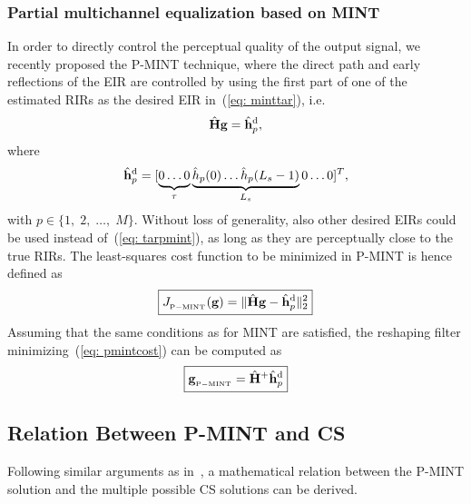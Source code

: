 \documentclass[10pt]{IEEEtran}
\begin{document}
\subsubsection*{Partial multichannel equalization based on MINT~\cite{Kodrasi_ICASSP_2012}}
In order to directly control the perceptual quality of the output signal, we recently proposed the P-MINT technique, where the direct path and early reflections of the EIR are controlled by using the first part of one of the estimated RIRs as the desired EIR in~(\ref{eq: minttar}), i.e.
\begin{equation}
\label{eq: PMINT}
\hat{\mathbf{H}} \mathbf{g} = \hat{\mathbf{h}}_{p}^{\rm d},
\end{equation}
where
\begin{equation}
\label{eq: tarpmint}
\hat{\mathbf{h}}_{p}^{\rm d} = [\underbrace{0\phantom{\rlap{$(L_s-1)$}} \ldots 0 }_{\tau} \underbrace{\hat{h}_p(0) \ldots \hat{h}_p(L_s-1)}_{L_s} 0 \ldots 0 ]^{T},
\end{equation}
with $p \in \{1, \; 2, \; \ldots, \; M \}$.
Without loss of generality, also other desired EIRs could be used instead of~(\ref{eq: tarpmint}), as long as they are perceptually close to the true RIRs.
The least-squares cost function to be minimized in P-MINT is hence defined as
\begin{equation}
\label{eq: pmintcost}
\boxed{J_{_{\rm P-MINT}}(\mathbf{g}) = \|\hat{\mathbf{H}}\mathbf{g} - \hat{\mathbf{h}}_p^{\rm d}\|_2^2}
\end{equation}
Assuming that the same conditions as for MINT are satisfied, the reshaping filter minimizing~(\ref{eq: pmintcost}) can be computed as
\begin{equation}
\label{eq: Pmintsol}
\boxed{\mathbf{g}_{{}_{\rm P-MINT}} = \hat{\mathbf{H}}^{+}\hat{\mathbf{h}}_p^{\rm d}}
\end{equation}

\subsection{Relation Between P-MINT and CS}
\label{sec: pmint_and_cs}
Following similar arguments as in~\cite{Zhang_IWAENC_2010}, a mathematical relation between the P-MINT solution and the multiple possible CS solutions can be derived.
\end{document}
